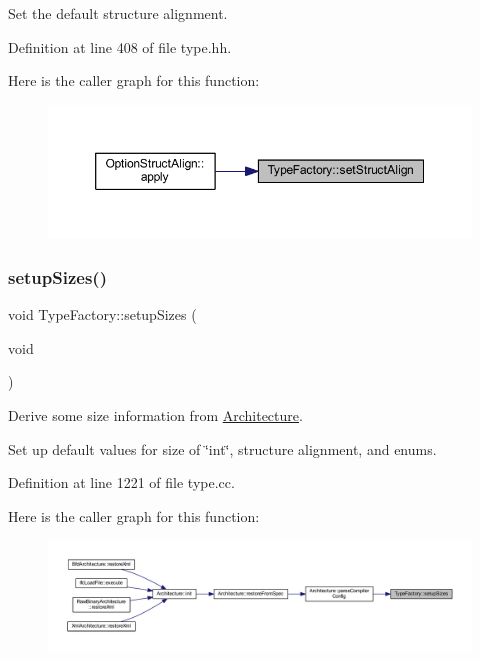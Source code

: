 Set the default structure alignment. 



Definition at line 408 of file type.\+hh.

Here is the caller graph for this function\+:
\nopagebreak
\begin{figure}[H]
\begin{center}
\leavevmode
\includegraphics[width=350pt]{class_type_factory_aa0ffda99be9ec6acf0bc8a963021e050_icgraph}
\end{center}
\end{figure}
\mbox{\label{class_type_factory_afae3189d62867e5358bcbb98e7723b75}} 
\subsubsection{\texorpdfstring{setupSizes()}{setupSizes()}}
{\footnotesize\ttfamily void Type\+Factory\+::setup\+Sizes (\begin{DoxyParamCaption}\item[{void}]{ }\end{DoxyParamCaption})}



Derive some size information from \mbox{\hyperlink{class_architecture}{Architecture}}. 

Set up default values for size of \char`\"{}int\char`\"{}, structure alignment, and enums. 

Definition at line 1221 of file type.\+cc.

Here is the caller graph for this function\+:
\nopagebreak
\begin{figure}[H]
\begin{center}
\leavevmode
\includegraphics[width=350pt]{class_type_factory_afae3189d62867e5358bcbb98e7723b75_icgraph}
\end{center}
\end{figure}


